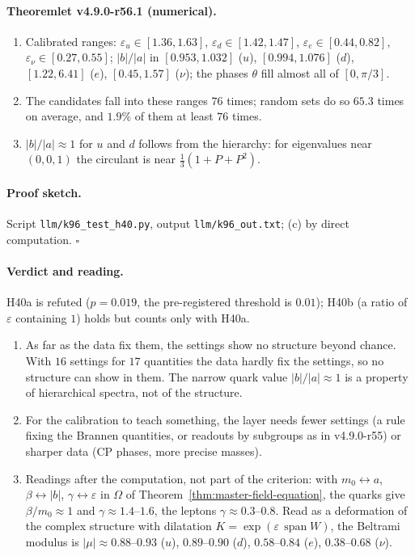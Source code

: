 \paragraph{Theoremlet v4.9.0-r56.1 (numerical).}
\begin{enumerate}[leftmargin=2em]
\item[(a)] Calibrated ranges: \(\varepsilon_u\in[1.36,1.63]\), \(\varepsilon_d\in[1.42,1.47]\), \(\varepsilon_e\in[0.44,0.82]\), \(\varepsilon_\nu\in[0.27,0.55]\);
\(|b|/|a|\) in \([0.953,1.032]\) (\(u\)), \([0.994,1.076]\) (\(d\)), \([1.22,6.41]\) (\(e\)), \([0.45,1.57]\) (\(\nu\)); the phases \(\theta\) fill almost all of
\([0,\pi/3]\).
\item[(b)] The candidates fall into these ranges \(76\) times; random sets do so \(65.3\) times on average, and \(1.9\%\) of them at least \(76\) times.
\item[(c)] \(|b|/|a|\approx1\) for \(u\) and \(d\) follows from the hierarchy: for eigenvalues near \((0,0,1)\) the circulant is near \(\tfrac13(1+P+P^2)\).
\end{enumerate}

\paragraph{Proof sketch.}
Script \texttt{llm/k96\_test\_h40.py}, output \texttt{llm/k96\_out.txt}; (c) by direct computation.  \(\square\)

\paragraph{Verdict and reading.}
H40a is refuted (\(p=0.019\), the pre-registered threshold is \(0.01\)); H40b (a ratio of \(\varepsilon\) containing \(1\)) holds but counts only with H40a.
\begin{enumerate}[leftmargin=2em]
\item As far as the data fix them, the settings show no structure beyond chance.  With \(16\) settings for \(17\) quantities the data hardly fix the
settings, so no structure can show in them.  The narrow quark value \(|b|/|a|\approx1\) is a property of hierarchical spectra, not of the structure.
\item For the calibration to teach something, the layer needs fewer settings (a rule fixing the Brannen quantities, or readouts by subgroups as in
v4.9.0-r55) or sharper data (CP phases, more precise masses).
\item Readings after the computation, not part of the criterion: with \(m_0\leftrightarrow a\), \(\beta\leftrightarrow|b|\), \(\gamma\leftrightarrow\varepsilon\) in
\(\Omega\) of Theorem~\ref{thm:master-field-equation}, the quarks give \(\beta/m_0\approx1\) and \(\gamma\approx1.4\)--\(1.6\), the leptons \(\gamma\approx0.3\)--\(0.8\).
Read as a deformation of the complex structure with dilatation \(K=\exp(\varepsilon\,\operatorname{span}W)\), the Beltrami modulus is
\(|\mu|\approx0.88\)--\(0.93\) (\(u\)), \(0.89\)--\(0.90\) (\(d\)), \(0.58\)--\(0.84\) (\(e\)), \(0.38\)--\(0.68\) (\(\nu\)).
\end{enumerate}

